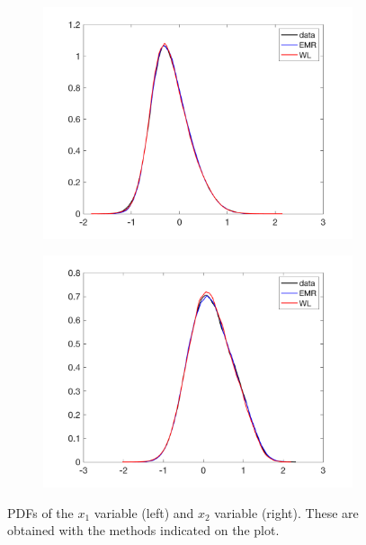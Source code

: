 \documentclass[12pt]{article}
\begin{document}
\begin{figure}[H]
	\centering
	\begin{subfigure}[b]{0.49\textwidth}
		\centering
		\includegraphics[width=\textwidth]{plots/climate_model/h1/pdfx1_e05_h1.png}
	\end{subfigure}
	\begin{subfigure}[b]{0.49\textwidth}
		\centering
		\includegraphics[width=\textwidth]{plots/climate_model/h1/pdfx2_e05_h1.png}
	\end{subfigure}
	\caption{\label{pdf 2}PDFs of the $x_1$ variable (left) and $x_2$ variable (right). These are obtained with the methods indicated on the plot.}
\end{figure}
\end{document}
